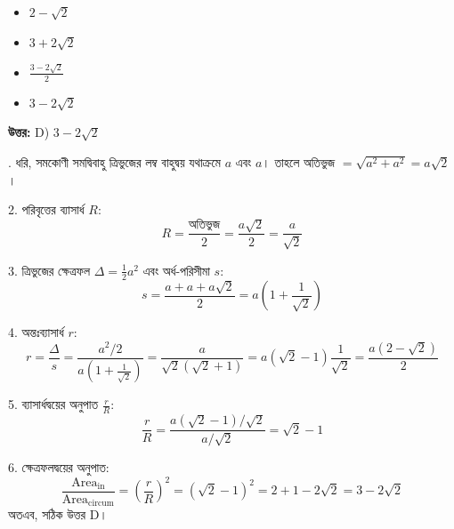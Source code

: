\documentclass[12pt, a4paper]{article}
\begin{document}
\begin{itemize}[label={}, leftmargin=1cm, itemsep=0.5em]
    \item[\textbf{A)}] $2 - \sqrt{2}$
    \item[\textbf{B)}] $3 + 2\sqrt{2}$
    \item[\textbf{C)}] $\frac{3 - 2\sqrt{2}}{2}$
    \item[\textbf{D)}] $3 - 2\sqrt{2}$
\end{itemize}

\vspace{0.5em}
\begin{tcolorbox}[answerbox]
    \textbf{\color{success} উত্তর:} D) $3 - 2\sqrt{2}$
\end{tcolorbox}
\vspace{1em}

\begin{tcolorbox}[solutionbox={সমাধান (Solution)}]
    . ধরি, সমকোণী সমদ্বিবাহু ত্রিভুজের লম্ব বাহুদ্বয় যথাক্রমে $a$ এবং $a$। 
    তাহলে অতিভুজ $= \sqrt{a^2 + a^2} = a\sqrt{2}$।
    
    \vspace{0.5em}
    2. পরিবৃত্তের ব্যাসার্ধ $R$:
    \[ R = \frac{\text{অতিভুজ}}{2} = \frac{a\sqrt{2}}{2} = \frac{a}{\sqrt{2}} \]
    
    3. ত্রিভুজের ক্ষেত্রফল $\Delta = \frac{1}{2}a^2$ এবং অর্ধ-পরিসীমা $s$:
    \[ s = \frac{a + a + a\sqrt{2}}{2} = a\left(1 + \frac{1}{\sqrt{2}}\right) \]
    
    4. অন্তঃব্যাসার্ধ $r$:
    \[ r = \frac{\Delta}{s} = \frac{a^2/2}{a\left(1 + \frac{1}{\sqrt{2}}\right)} = \frac{a}{\sqrt{2}(\sqrt{2}+1)} = a(\sqrt{2}-1)\frac{1}{\sqrt{2}} = \frac{a(2-\sqrt{2})}{2} \]
    
    5. ব্যাসার্ধদ্বয়ের অনুপাত $\frac{r}{R}$:
    \[ \frac{r}{R} = \frac{a(\sqrt{2}-1)/\sqrt{2}}{a/\sqrt{2}} = \sqrt{2} - 1 \]
    
    6. ক্ষেত্রফলদ্বয়ের অনুপাত:
    \[ \frac{\text{Area}_{\text{in}}}{\text{Area}_{\text{circum}}} = \left(\frac{r}{R}\right)^2 = (\sqrt{2}-1)^2 = 2 + 1 - 2\sqrt{2} = 3 - 2\sqrt{2} \]
    অতএব, সঠিক উত্তর D।
\end{tcolorbox}
\end{document}

